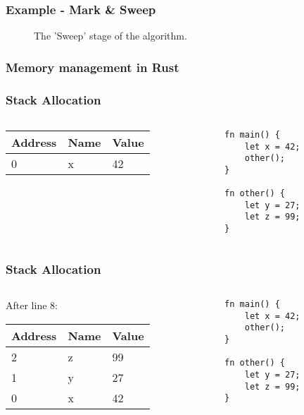 \documentclass{beamer}
\begin{document}
\begin{frame}
	\frametitle{Example - Mark \& Sweep}
	\begin{figure}
		\centering
		\def\svgwidth{230pt}
		
		\caption{The 'Sweep' stage of the algorithm.}
	\end{figure}
\end{frame}
\begin{frame}
	\frametitle{Memory management in Rust}
\end{frame}
\begin{frame}[fragile]
	\frametitle{Stack Allocation}
	\begin{columns}[T, c]
		\begin{column}{0.48\textwidth}
			\begin{tabular}{| l | l | l |}
				\hline
				Address & Name & Value \\ \hline
				0 & x & 42 \\ \hline
			\end{tabular}
		\end{column}
		\begin{column}{0.48\textwidth}
			\begin{verbatim}
fn main() {
    let x = 42;
    other();
}

fn other() {
	let y = 27;
	let z = 99;
}
			\end{verbatim}
		\end{column}
	\end{columns}
\end{frame}
\begin{frame}[fragile]
	\frametitle{Stack Allocation}
	\begin{columns}[T, c]
		\begin{column}{0.48\textwidth}
			After line 8:
			\begin{tabular}{| l | l | l |}
				\hline
				Address & Name & Value \\ \hline
				2 & z & 99 \\ \hline
				1 & y & 27 \\ \hline
				0 & x & 42 \\ \hline
			\end{tabular}
		\end{column}
		\begin{column}{0.48\textwidth}
			\begin{verbatim}
fn main() {
	let x = 42;
	other();
}

fn other() {
	let y = 27;
	let z = 99;
}
			\end{verbatim}
		\end{column}
	\end{columns}
\end{frame}
\end{document}
